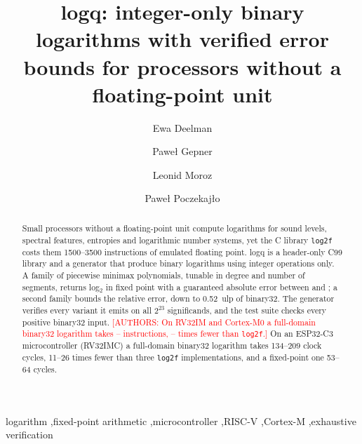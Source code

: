 \documentclass[preprint,12pt]{elsarticle}
\newcommand{\authors}[1]{\textcolor{red}{[AUTHORS: #1]}}
\begin{document}
\begin{frontmatter}

\title{logq: integer-only binary logarithms with verified error bounds for processors without a floating-point unit}

\author[usc]{Ewa Deelman}
\author[pw]{Pawe{\l} Gepner}
\author[pw]{Leonid Moroz}
\author[pk]{Pawe{\l} Poczekaj{\l}o}
\address[usc]{University of Southern California, Information Sciences Institute, Marina del Rey, 90292, CA, USA}
\address[pw]{Warsaw University of Technology, Faculty of Mechanical and Industrial Engineering, 02-524 Warszawa, Poland}
\address[pk]{Koszalin University of Technology, Faculty of Electronics and Computer Science, 75-453, Koszalin, Poland}

\begin{abstract}
Small processors without a floating-point unit compute logarithms for sound
levels, spectral features, entropies and logarithmic number systems, yet the
C library \texttt{log2f} costs them 1500--3500 instructions of emulated
floating point. logq is a header-only C99 library and a generator that produce
binary logarithms using integer operations only. A family of piecewise minimax
polynomials, tunable in degree and number of segments, returns log$_2$ in
fixed point with a guaranteed absolute error between \numEmax{} and
\numEmin{}; a second family bounds the relative error, down to 0.52~ulp of
binary32. The generator verifies every variant it emits on all $2^{23}$
significands, and the test suite checks every positive binary32 input. \authors {On
RV32IM and Cortex-M0 a full-domain binary32 logarithm takes \numinsmin--\numinsmax{}
instructions, \numratmin--\numratmax{} times fewer than \texttt{log2f}.}
On an ESP32-C3 microcontroller (RV32IMC) a full-domain binary32 logarithm
takes 134--209 clock cycles, 11--26 times fewer than three \texttt{log2f}
implementations, and a fixed-point one 53--64 cycles.
\end{abstract}

\begin{keyword}
logarithm \sep fixed-point arithmetic \sep microcontroller \sep RISC-V \sep Cortex-M \sep exhaustive verification
\end{keyword}
\end{frontmatter}
\end{document}
